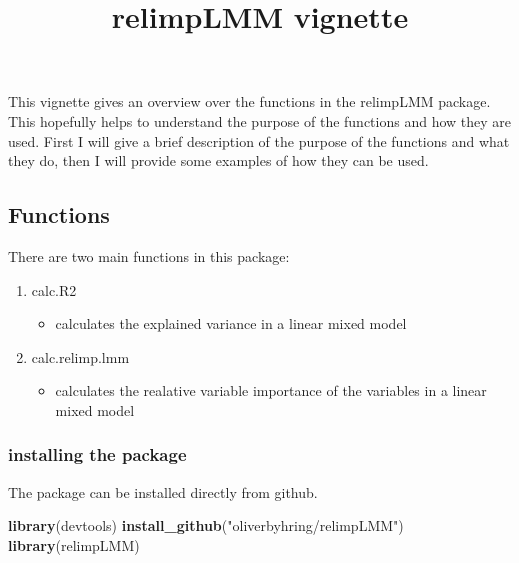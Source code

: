 \documentclass[
]{article}
\title{relimpLMM vignette}
\author{}
\date{\vspace{-2.5em}}
\newenvironment{Shaded}{\begin{snugshade}}{\end{snugshade}}
\newcommand{\KeywordTok}[1]{\textcolor[rgb]{0.13,0.29,0.53}{\textbf{#1}}}
\newcommand{\NormalTok}[1]{#1}
\newcommand{\StringTok}[1]{\textcolor[rgb]{0.31,0.60,0.02}{#1}}
\providecommand{\tightlist}{%
  \setlength{\itemsep}{0pt}\setlength{\parskip}{0pt}}
\begin{document}
\maketitle

This vignette gives an overview over the functions in the relimpLMM
package. This hopefully helps to understand the purpose of the functions
and how they are used. First I will give a brief description of the
purpose of the functions and what they do, then I will provide some
examples of how they can be used.

\hypertarget{functions}{%
\subsection{Functions}\label{functions}}

There are two main functions in this package:

\begin{enumerate}
\def\labelenumi{\arabic{enumi}.}
\tightlist
\item
  calc.R2

  \begin{itemize}
  \tightlist
  \item
    calculates the explained variance in a linear mixed model
  \end{itemize}
\item
  calc.relimp.lmm

  \begin{itemize}
  \tightlist
  \item
    calculates the realative variable importance of the variables in a
    linear mixed model
  \end{itemize}
\end{enumerate}

\hypertarget{installing-the-package}{%
\subsubsection{installing the package}\label{installing-the-package}}

The package can be installed directly from github.

\begin{Shaded}
\begin{Highlighting}[]
\KeywordTok{library}\NormalTok{(devtools)}
\KeywordTok{install_github}\NormalTok{(}\StringTok{"oliverbyhring/relimpLMM"}\NormalTok{)}
\KeywordTok{library}\NormalTok{(relimpLMM)}
\end{Highlighting}
\end{Shaded}
\end{document}
